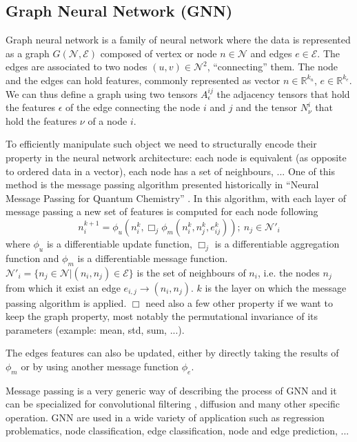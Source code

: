 \documentclass[../main.tex]{subfiles}
\begin{document}
\subsection{Graph Neural Network (GNN)}

Graph neural network is a family of neural network where the data is represented as a graph $G(\mathcal{N},\mathcal{E})$ composed of vertex or node $n \in \mathcal{N}$ and edges $e \in \mathcal{E}$. The edges are associated to two nodes $(u, v) \in \mathcal{N}^2$, ``connecting'' them. The node and the edges can hold features, commonly represented as vector $n \in \mathbb{R}^{k_{n}}$, $e \in \mathbb{R}^{k_{e}}$. We can thus define a graph using two tensors $A^{ij}_{\epsilon}$ the adjacency tensors that hold the features $\epsilon$ of the edge connecting the node $i$ and $j$ and the tensor $N^{i}_{\nu}$ that hold the features $\nu$ of a node $i$.

To efficiently manipulate such object we need to structurally encode their property in the neural network architecture: each node is equivalent (as opposite to ordered data in a vector), each node has a set of neighbours, ... One of this method is the message passing algorithm presented historically in ``Neural Message Passing for Quantum Chemistry'' \cite{gilmer_neural_2017}. In this algorithm, with each layer of message passing a new set of features is computed for each node following
\begin{equation}
  n_i^{k+1} = \phi_u (n_i^k, \Box_j \phi_m(n_i^k, n_j^k, e^k_{ij})); ~ n_j \in \mathcal{N}'_i
\end{equation}
where $\phi_u$ is a differentiable update function, $\Box_j$ is a differentiable aggregation function and $\phi_m$ is a differentiable message function. $\mathcal{N}'_i = \{n_j \in \mathcal{N} | (n_i, n_j) \in \mathcal{E}\}$ is the set of neighbours of $n_i$, i.e. the nodes $n_j$ from which it exist an edge $e_{i,j} \rightarrow (n_i, n_j)$. $k$ is the layer on which the message passing algorithm is applied. $\Box$ need also a few other property if we want to keep the graph property, most notably the permutational invariance of its parameters (example: mean, std, sum, ...).

The edges features can also be updated, either by directly taking the results of $\phi_m$ or by using another message function $\phi_e$.


Message passing is a very generic way of describing the process of GNN and it can be specialized for convolutional filtering \cite{defferrard_convolutional_2017}, diffusion \cite{li_diffusion_2018} and many other specific operation. GNN are used in a wide variety of application such as regression problematics, node classification, edge classification, node and edge prediction, ...
\end{document}
